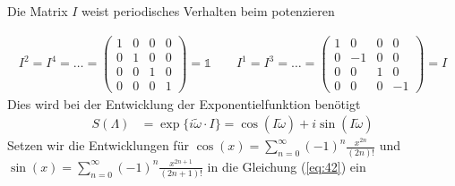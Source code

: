 Die Matrix \(I\) weist periodisches Verhalten beim potenzieren

\begin{align}
  \label{eq:41}
  I^2= I^4=\dots= \begin{pmatrix}1&0&0&0\\0&1&0&0\\ 0&0&1&0\\0&0&0&1 \end{pmatrix}=\mathds 1 \qquad 
 I^1= I^3=\dots= \begin{pmatrix}1&0&0&0\\0&-1&0&0\\ 0&0&1&0\\0&0&0&-1 \end{pmatrix}=I 
\end{align}
Dies wird bei der Entwicklung der Exponentielfunktion benötigt
\begin{align}
  \label{eq:42}
   S(\Lambda) &= \exp\{ i\tilde\omega \cdot I \} = \cos(I\tilde\omega) + i\sin(I\tilde\omega)
\end{align}
Setzen wir die Entwicklungen für \(\cos(x)=\sum_{n=0}^{\infty}(-1)^n\frac{x^{2n}}{(2n)!}\) und \(\sin(x)=\sum_{n=0}^{\infty}(-1)^n\frac{x^{2n+1}}{(2n+1)!}\) in die Gleichung (\ref{eq:42}) ein

